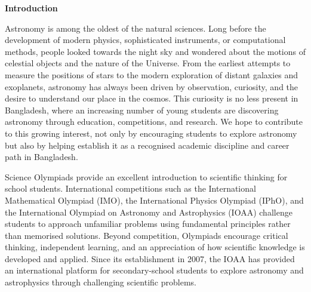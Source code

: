 \documentclass[10pt,a5paper,twoside]{article}
\newcounter{problem}[section]
\begin{document}
\tableofcontents
\clearpage



\thispagestyle{empty}

{}

\begin{center}
	\vspace*{1cm}
	{\Large\bfseries Introduction\par}
\end{center}

\vspace{0.8cm}


Astronomy is among the oldest of the natural sciences. Long before the development of modern physics, sophisticated instruments, or computational methods, people looked towards the night sky and wondered about the motions of celestial objects and the nature of the Universe. From the earliest attempts to measure the positions of stars to the modern exploration of distant galaxies and exoplanets, astronomy has always been driven by observation, curiosity, and the desire to understand our place in the cosmos. This curiosity is no less present in Bangladesh, where an increasing number of young students are discovering astronomy through education, competitions, and research. We hope to contribute to this growing interest, not only by encouraging students to explore astronomy but also by helping establish it as a recognised academic discipline and career path in Bangladesh.

Science Olympiads provide an excellent introduction to scientific thinking for school students. International competitions such as the International Mathematical Olympiad (IMO), the International Physics Olympiad (IPhO), and the International Olympiad on Astronomy and Astrophysics (IOAA) challenge students to approach unfamiliar problems using fundamental principles rather than memorised solutions. Beyond competition, Olympiads encourage critical thinking, independent learning, and an appreciation of how scientific knowledge is developed and applied. Since its establishment in 2007, the IOAA has provided an international platform for secondary-school students to explore astronomy and astrophysics through challenging scientific problems.
\end{document}
